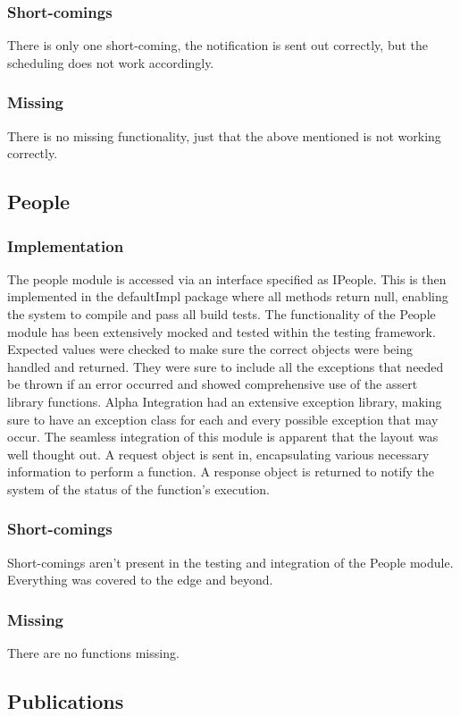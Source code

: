 \documentclass{article}
\begin{document}
        \subsubsection{Short-comings}
        There is only one short-coming, the notification is sent out correctly, but the scheduling does not work accordingly. 
        \subsubsection{Missing}
        There is no missing functionality, just that the above mentioned is not working correctly.
    \subsection{People}
        \subsubsection{Implementation}
		The people module is accessed via an interface specified as IPeople. This is then implemented in the defaultImpl package where all methods return null, enabling the system to compile and pass all build tests. The functionality of the People module has been extensively mocked and tested within the testing framework. Expected values were checked to make sure the correct objects were being handled and returned. They were sure to include all the exceptions that needed be thrown if an error occurred and showed comprehensive use of the assert library functions. Alpha Integration had an extensive exception library, making sure to have an exception class for each and every possible exception that may occur. The seamless integration of this module is apparent that the layout was well thought out. A request object is sent in, encapsulating various necessary information to perform a function. A response object is returned to notify the system of the status of the function's execution.
		\subsubsection{Short-comings}
		Short-comings aren't present in the testing and integration of the People module. Everything was covered to the edge and beyond.
		\subsubsection{Missing}
		There are no functions missing.
		
	\subsection{Publications}
\end{document}
